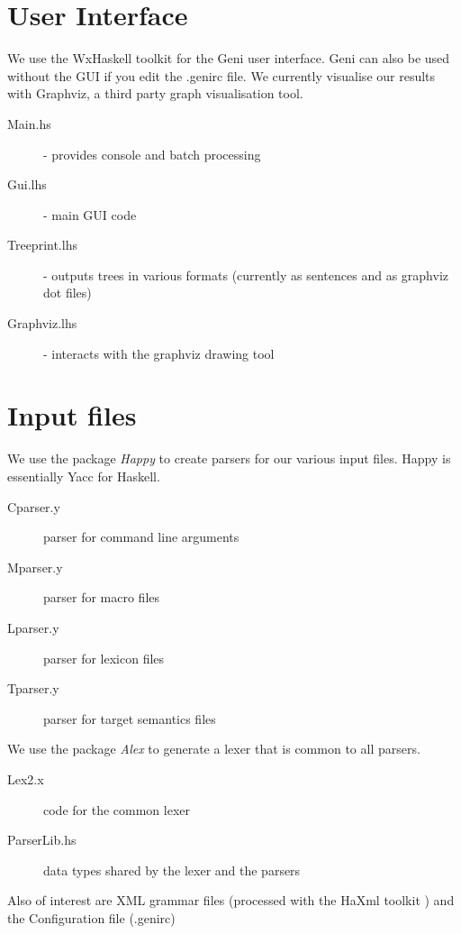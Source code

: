 \documentclass[11pt]{report}
\begin{document}
\section{User Interface}

We use the WxHaskell toolkit for the Geni user interface.  Geni
can also be used without the GUI if you edit the .genirc file.
We currently visualise our results with Graphviz, a third party graph
visualisation tool.

\begin{description}
 \item[Main.hs] - provides console and batch processing 
 \item[Gui.lhs] - main GUI code 
 \item[Treeprint.lhs] - outputs trees in various formats 
                        (currently as sentences and as graphviz dot
                        files)
 \item[Graphviz.lhs] - interacts with the graphviz drawing tool
\end{description}

\section{Input files}

We use the package \textit{Happy} to create parsers for our various
input files.  Happy is essentially Yacc for Haskell.

\begin{description}
 \item[Cparser.y] parser for command line arguments
 \item[Mparser.y] parser for macro files 
 \item[Lparser.y] parser for lexicon files 
 \item[Tparser.y] parser for target semantics files 
\end{description}

We use the package \textit{Alex} to generate a lexer that is common to
all parsers.

\begin{description}
 \item[Lex2.x] code for the common lexer
 \item[ParserLib.hs] data types shared by the lexer and the parsers 
\end{description}

Also of interest are XML grammar files (processed with the HaXml toolkit
) and the Configuration file (.genirc)
\end{document}
